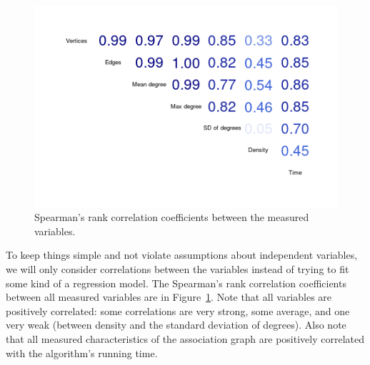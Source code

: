 \documentclass{l4proj}
\theoremstyle{definition}
\theoremstyle{remark}
\begin{document}
\begin{figure}
  \centering
  \includegraphics[scale=0.5]{images/correlations.png}
  \caption{Spearman's rank correlation coefficients between the measured
    variables.}
  \label{fig:correlations}
\end{figure}

To keep things simple and not violate assumptions about independent variables,
we will only consider correlations between the variables instead of trying to
fit some kind of a regression model. The Spearman's rank correlation
coefficients between all measured variables are in
Figure~\ref{fig:correlations}. Note that all variables are positively
correlated: some correlations are very strong, some average, and one very weak
(between density and the standard deviation of degrees). Also note that all
measured characteristics of the association graph are positively correlated with
the algorithm's running time.
\end{document}

